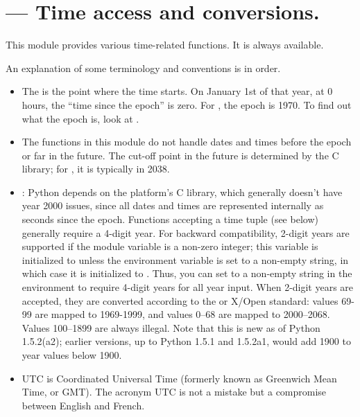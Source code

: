 \section{ ---
         Time access and conversions.}



This module provides various time-related functions.
It is always available.

An explanation of some terminology and conventions is in order.

\begin{itemize}

\item
The  is the point where the time starts.  On
January 1st of that year, at 0 hours, the ``time since the epoch'' is
zero.  For \UNIX{}, the epoch is 1970.  To find out what the epoch is,
look at .

\item
The functions in this module do not handle dates and times before the
epoch or far in the future.  The cut-off point in the future is
determined by the C library; for \UNIX{}, it is typically in
2038.

\item
{}:  Python
depends on the platform's C library, which generally doesn't have year
2000 issues, since all dates and times are represented internally as
seconds since the epoch.  Functions accepting a time tuple (see below)
generally require a 4-digit year.  For backward compatibility, 2-digit
years are supported if the module variable  is a
non-zero integer; this variable is initialized to  unless the
environment variable  is set to a non-empty string,
in which case it is initialized to .  Thus, you can set
 to a non-empty string in the environment to require 4-digit
years for all year input.  When 2-digit years are accepted, they are
converted according to the \POSIX{} or X/Open standard: values 69-99
are mapped to 1969-1999, and values 0--68 are mapped to 2000--2068.
Values 100--1899 are always illegal.  Note that this is new as of
Python 1.5.2(a2); earlier versions, up to Python 1.5.1 and 1.5.2a1,
would add 1900 to year values below 1900.

\item
UTC is Coordinated Universal Time (formerly known as Greenwich Mean
Time, or GMT).  The acronym UTC is not a
mistake but a compromise between English and French.


\end{itemize}
